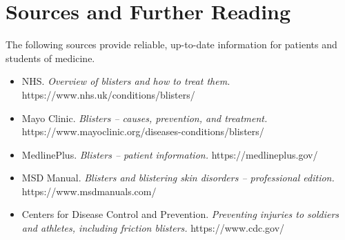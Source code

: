 \section*{Sources and Further Reading}
The following sources provide reliable, up-to-date information for patients and students of medicine.

\begin{itemize}
    \item NHS. \textit{Overview of blisters and how to treat them.} https://www.nhs.uk/conditions/blisters/
    \item Mayo Clinic. \textit{Blisters -- causes, prevention, and treatment.} https://www.mayoclinic.org/diseases-conditions/blisters/
    \item MedlinePlus. \textit{Blisters -- patient information.} https://medlineplus.gov/
    \item MSD Manual. \textit{Blisters and blistering skin disorders -- professional edition.} https://www.msdmanuals.com/
    \item Centers for Disease Control and Prevention. \textit{Preventing injuries to soldiers and athletes, including friction blisters.} https://www.cdc.gov/
\end{itemize}
